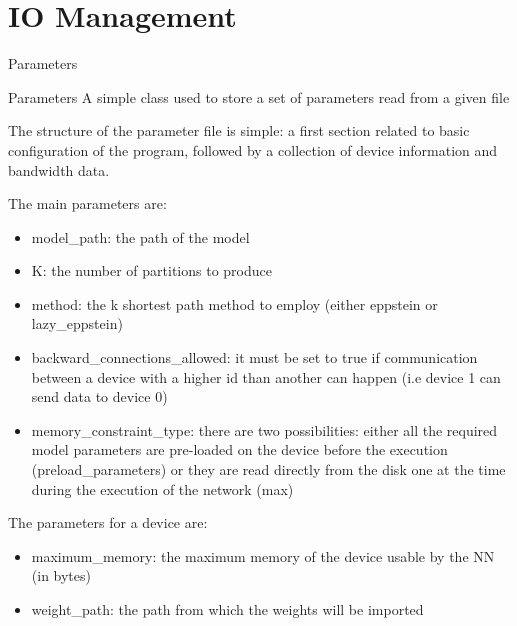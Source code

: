 \section{IO Management}

\begin{frame}[plain]{}
    \sectionpage
\end{frame}

\begin{frame}[allowframebreaks]{Parameters}
    \begin{block}{Parameters}
    A simple class used to store a set of parameters read from a given file
    \end{block}
    The structure of the parameter file is simple: a first section related to basic configuration of the program, followed by a collection of device information and bandwidth data.
    
    \framebreak
    
    The main parameters are:
    \begin{itemize}
        \item model\_path: the path of the model
        \item K: the number of partitions to produce
        \item method: the k shortest path method to employ (either eppstein or lazy\_eppstein)
        \item backward\_connections\_allowed: it must be set to true if communication between a device with a higher id than another can happen (i.e device 1 can send data to device 0)
        \item memory\_constraint\_type: there are two possibilities: either all the required model parameters are pre-loaded on the device before the execution (preload\_parameters) or they are read directly from the disk one at the time during the execution of the network (max)
    \end{itemize}
    
    \framebreak
    
    The parameters for a device are:
    \begin{itemize}
        \item maximum\_memory: the maximum memory of the device usable by the NN (in bytes)
        \item weight\_path: the path from which the weights will be imported
    \end{itemize}
    
\end{frame}

